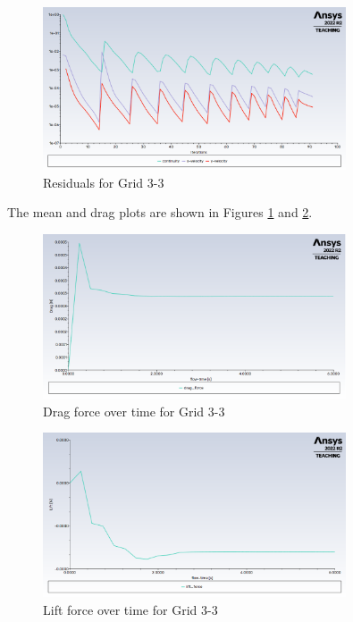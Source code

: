 \begin{figure}[H]
    \centering
    \includegraphics[width=0.8\textwidth]{Questions/Figures/residuals plot grid 3 3.png}
    \caption{Residuals for Grid 3-3}
\end{figure}

The mean and drag plots are shown in Figures \ref{fig:drag force plot grid 3 3} and \ref{fig:lift force plot grid 3 3}.
\begin{figure}[H]
    \centering
    \includegraphics[width=0.8\textwidth]{Questions/Figures/drag force plot grid 3 3.png}
    \caption{Drag force over time for Grid 3-3}
    \label{fig:drag force plot grid 3 3}
\end{figure}
\begin{figure}[H]
    \centering
    \includegraphics[width=0.8\textwidth]{Questions/Figures/lift force plot grid 3 3.png}
    \caption{Lift force over time for Grid 3-3}
    \label{fig:lift force plot grid 3 3}
\end{figure}
